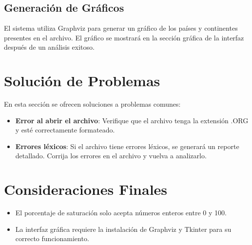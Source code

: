 \documentclass[12pt, letterpaper, twosite]{article}
\begin{document}
\subsection{Generación de Gráficos}
El sistema utiliza Graphviz para generar un gráfico de los países y continentes presentes en el archivo. El gráfico se mostrará en la sección gráfica de la interfaz después de un análisis exitoso.

\section{Solución de Problemas}
En esta sección se ofrecen soluciones a problemas comunes:
\begin{itemize}
    \item \textbf{Error al abrir el archivo}: Verifique que el archivo tenga la extensión .ORG y esté correctamente formateado.
    \item \textbf{Errores léxicos}: Si el archivo tiene errores léxicos, se generará un reporte detallado. Corrija los errores en el archivo y vuelva a analizarlo.
\end{itemize}

\section{Consideraciones Finales}
\begin{itemize}
    \item El porcentaje de saturación solo acepta números enteros entre 0 y 100.
    \item La interfaz gráfica requiere la instalación de Graphviz y Tkinter para su correcto funcionamiento.
\end{itemize}
\end{document}
